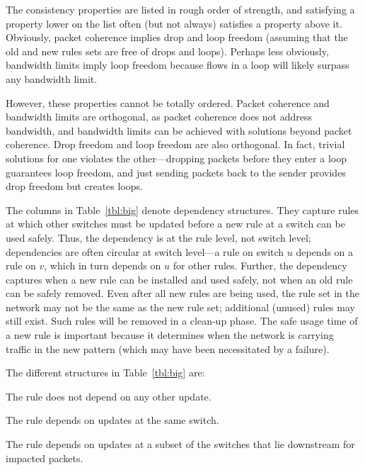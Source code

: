 The consistency properties are listed in rough order of strength, and satisfying a property lower on the list often (but not always) satisfies a property above it. Obviously, packet coherence implies drop and loop freedom (assuming that the old and new rules sets are free of drops and loops). Perhaps less obviously, bandwidth limits imply loop freedom because flows in a loop will likely surpass any bandwidth limit.

However, these properties cannot be totally ordered. Packet coherence and bandwidth limits are orthogonal, as packet coherence does not address bandwidth, and bandwidth limits can be achieved with solutions beyond packet coherence.
Drop freedom and loop freedom are also orthogonal. In fact, trivial solutions for one violates the other---dropping packets before they enter a loop guarantees loop freedom, and just sending packets back to the sender provides drop freedom but creates loops.


The columns in Table~\ref{tbl:big} denote dependency structures. They capture rules at which other switches must be updated before a new rule at a switch can be used safely. Thus, the dependency is at the rule level, not switch level; dependencies are often circular at switch level---a rule on switch $u$ depends on a rule on $v$, which in turn depends on $u$ for other rules.
Further, the dependency captures when a new rule can be installed and used safely, not when an old rule can be safely removed. Even after all new rules are being used, the rule set in the network may not be the same as the new rule set; additional (unused) rules may still exist. Such rules will be removed in a clean-up phase. The safe usage time of a new rule is important because it determines when the network is carrying traffic in the new pattern (which may have been necessitated by a failure).



The different structures in Table~\ref{tbl:big} are:

 The rule does not depend on any other update.

 The rule depends on updates at the same switch.

 The rule depends on updates at a subset of the switches that lie downstream for impacted packets.

